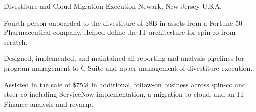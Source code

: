 \begin{cventries}
  \cventry
    {Divestiture and Cloud Migration Execution} %
    {} %
    {} %
    {Newark, New Jersey U.S.A.} %
    {
      \begin{cvitems} %
        \item {Fourth person onboarded to the divestiture of \$8B in assets from a Fortune 50 Pharmaceutical company. Helped define the IT architecture for spin-co from scratch.}
        \item {Designed, implemented, and maintained all reporting and analysis pipelines for program management to C-Suite and upper management of divestiture execution.}
        \item {Assisted in the sale of \$75M in additional, follow-on business across spin-co and steer-co including ServiceNow implementation, a migration to cloud, and an IT Finance analysis and revamp.}
      \end{cvitems}
    }

\end{cventries}